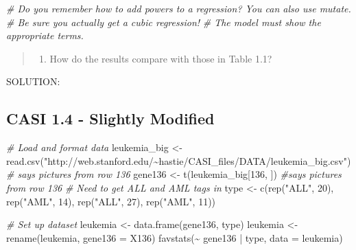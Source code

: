 \documentclass[
]{article}
\newenvironment{Shaded}{\begin{snugshade}}{\end{snugshade}}
\newcommand{\AttributeTok}[1]{\textcolor[rgb]{0.77,0.63,0.00}{#1}}
\newcommand{\CommentTok}[1]{\textcolor[rgb]{0.56,0.35,0.01}{\textit{#1}}}
\newcommand{\DecValTok}[1]{\textcolor[rgb]{0.00,0.00,0.81}{#1}}
\newcommand{\FunctionTok}[1]{\textcolor[rgb]{0.00,0.00,0.00}{#1}}
\newcommand{\NormalTok}[1]{#1}
\newcommand{\OtherTok}[1]{\textcolor[rgb]{0.56,0.35,0.01}{#1}}
\newcommand{\SpecialCharTok}[1]{\textcolor[rgb]{0.00,0.00,0.00}{#1}}
\newcommand{\StringTok}[1]{\textcolor[rgb]{0.31,0.60,0.02}{#1}}
\providecommand{\tightlist}{%
  \setlength{\itemsep}{0pt}\setlength{\parskip}{0pt}}
\begin{document}
\begin{Shaded}
\begin{Highlighting}[]
\CommentTok{\# Do you remember how to add powers to a regression? You can also use mutate. }
\CommentTok{\# Be sure you actually get a cubic regression! }
\CommentTok{\# The model must show the appropriate terms.}
\end{Highlighting}
\end{Shaded}

\begin{quote}
\begin{enumerate}
\def\labelenumi{(\alph{enumi})}
\setcounter{enumi}{1}
\tightlist
\item
  How do the results compare with those in Table 1.1?
\end{enumerate}
\end{quote}

SOLUTION:

\newpage

\hypertarget{casi-1.4---slightly-modified}{%
\subsection{CASI 1.4 - Slightly
Modified}\label{casi-1.4---slightly-modified}}

\begin{Shaded}
\begin{Highlighting}[]
\CommentTok{\# Load and format data}
\NormalTok{leukemia\_big }\OtherTok{\textless{}{-}} \FunctionTok{read.csv}\NormalTok{(}\StringTok{"http://web.stanford.edu/\textasciitilde{}hastie/CASI\_files/DATA/leukemia\_big.csv"}\NormalTok{)}
\CommentTok{\# says pictures from row 136}
\NormalTok{gene136 }\OtherTok{\textless{}{-}} \FunctionTok{t}\NormalTok{(leukemia\_big[}\DecValTok{136}\NormalTok{, ]) }\CommentTok{\#says pictures from row 136}
\CommentTok{\# Need to get ALL and AML tags in}
\NormalTok{type }\OtherTok{\textless{}{-}} \FunctionTok{c}\NormalTok{(}\FunctionTok{rep}\NormalTok{(}\StringTok{"ALL"}\NormalTok{, }\DecValTok{20}\NormalTok{), }\FunctionTok{rep}\NormalTok{(}\StringTok{"AML"}\NormalTok{, }\DecValTok{14}\NormalTok{), }\FunctionTok{rep}\NormalTok{(}\StringTok{"ALL"}\NormalTok{, }\DecValTok{27}\NormalTok{), }\FunctionTok{rep}\NormalTok{(}\StringTok{"AML"}\NormalTok{, }\DecValTok{11}\NormalTok{))}

\CommentTok{\# Set up dataset}
\NormalTok{leukemia }\OtherTok{\textless{}{-}} \FunctionTok{data.frame}\NormalTok{(gene136, type)}
\NormalTok{leukemia }\OtherTok{\textless{}{-}} \FunctionTok{rename}\NormalTok{(leukemia, }\AttributeTok{gene136 =}\NormalTok{ X136)}
\FunctionTok{favstats}\NormalTok{(}\SpecialCharTok{\textasciitilde{}}\NormalTok{ gene136 }\SpecialCharTok{|}\NormalTok{ type, }\AttributeTok{data =}\NormalTok{ leukemia)}
\end{Highlighting}
\end{Shaded}
\end{document}
